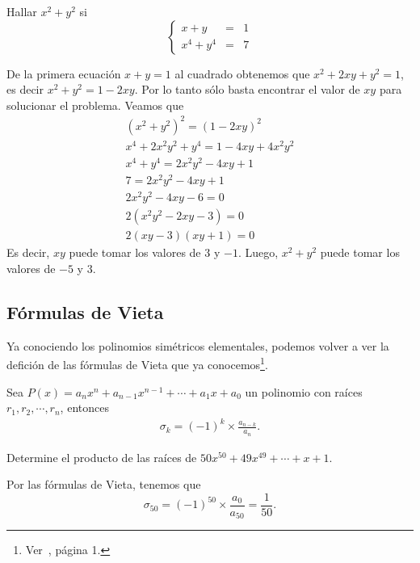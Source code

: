 \begin{example}
    Hallar $x^2 + y^2$ si
    \[
        \left\{
        \begin{array}{rcl}
            x + y & =& 1\\
            x^4 + y^4 & =& 7
        \end{array}
        \right.
    \]
\end{example}
\begin{solution}
    De la primera ecuación $x + y = 1$ al cuadrado obtenemos que $x^2 + 2xy + y^2 = 1$, es decir $x^2 + y^2 = 1 - 2xy$.
    Por lo tanto sólo basta encontrar el valor de $xy$ para solucionar el problema.
    Veamos que
    \begin{gather*}
        (x^2 + y^2)^2 = (1 - 2xy)^2 \\
        x^4 + 2x^2 y^2 + y^4 = 1 - 4xy + 4x^2 y^2\\
        x^4 + y^4 = 2x^2 y^2 - 4xy + 1\\
        7 = 2x^2 y^2 - 4xy + 1\\
        2x^2 y^2 - 4xy - 6 = 0\\
        2(x^2 y^2 - 2xy - 3) = 0\\
        2(xy - 3)(xy + 1) = 0
    \end{gather*}
    Es decir, $xy$ puede tomar los valores de $3$ y $-1$.
    Luego, $x^2 + y^2$ puede tomar los valores de $\boxed{-5}$ y $\boxed{3}$.
\end{solution}



\subsection{Fórmulas de Vieta}

Ya conociendo los polinomios simétricos elementales, podemos volver a ver la defición de las fórmulas de Vieta que ya conocemos\footnote{Ver~\cite{TD23-clase4}, página 1.}.

\begin{definition}
    Sea $P(x) = a_n x^n + a_{n - 1} x^{n - 1} + \cdots  + a_1 x + a_0$ un polinomio con raíces $r_1, r_2, \cdots, r_n$,
    entonces
    \begin{gather*}
        \sigma_k = (-1)^k\times \frac{a_{n - k}}{a_n}.
    \end{gather*}
\end{definition}

\begin{example}
    Determine el producto de las raíces de $50x^{50} + 49x^{49} + \cdots + x + 1.$
\end{example}
\begin{solution}
    Por las fórmulas de Vieta, tenemos que
    \[\sigma_{50} = (-1)^{50} \times \frac{a_0}{a_{50}} = \boxed{\frac{1}{50}}. \]
\end{solution}

